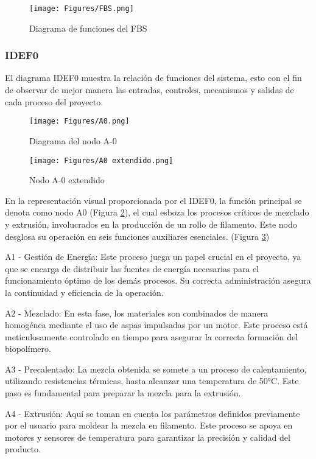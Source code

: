 \documentclass[14pt,oneside]{extarticle} %
\begin{document}
\begin{figure}[H]
    \centering
    \texttt{[image: Figures/FBS.png]}
    \caption{Diagrama de funciones del FBS}
    \label{fig:FBS}
\end{figure}

\subsubsection{IDEF0}

El diagrama IDEF0 muestra la relación de funciones del sistema, esto con el fin de observar de mejor manera las entradas, controles, mecanismos y salidas de cada proceso del proyecto.
\begin{figure}[H]
    \centering
    \texttt{[image: Figures/A0.png]}
    \caption{Diagrama del nodo A-0}
    \label{fig:idef0}
\end{figure}
\begin{figure}[H]
    \centering
    \texttt{[image: Figures/A0 extendido.png]}
    \caption{Nodo A-0 extendido}
    \label{fig:nodoA0_extendido}
\end{figure}

En la representación visual proporcionada por el IDEF0, la función principal se denota como nodo A0 (Figura \ref{fig:idef0}), el cual esboza los procesos críticos de mezclado y extrusión, involucrados en la producción de un rollo de filamento. Este nodo desglosa su operación en seis funciones auxiliares esenciales. (Figura \ref{fig:nodoA0_extendido})

A1 - Gestión de Energía: Este proceso juega un papel crucial en el proyecto, ya que se encarga de distribuir las fuentes de energía necesarias para el funcionamiento óptimo de los demás procesos. Su correcta administración asegura la continuidad y eficiencia de la operación.

A2 - Mezclado: En esta fase, los materiales son combinados de manera homogénea mediante el uso de aspas impulsadas por un motor. Este proceso está meticulosamente controlado en tiempo para asegurar la correcta formación del biopolímero.

A3 - Precalentado: La mezcla obtenida se somete a un proceso de calentamiento, utilizando resistencias térmicas, hasta alcanzar una temperatura de 50°C. Este paso es fundamental para preparar la mezcla para la extrusión.

\newpage
A4 - Extrusión: Aquí se toman en cuenta los parámetros definidos previamente por el usuario para moldear la mezcla en filamento. Este proceso se apoya en motores y sensores de temperatura para garantizar la precisión y calidad del producto.
\end{document}
